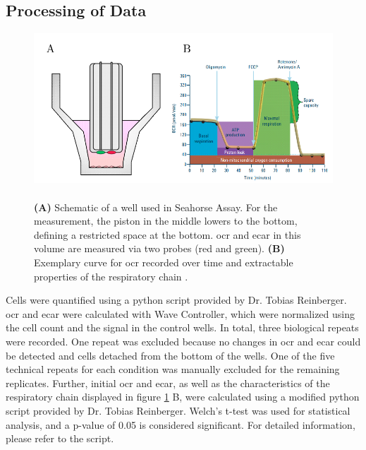     \subsection{Processing of Data}
    \begin{figure}[h]
    \capstart
        \centering
        \includegraphics{Abbildung/seahorse_basics_placeholder.pdf}

        \begin{minipage}{\captionwidth}
            \caption[enrichment]{\\
            \textbf{(A)} Schematic of a well used in Seahorse Assay. For the measurement, the piston in the middle lowers to the bottom, defining a restricted space at the bottom. \ac{ocr} and \ac{ecar} in this volume are measured via two probes (red and green). \textbf{(B)} Exemplary curve for \ac{ocr} recorded over time and extractable properties of the respiratory chain \cite{AGILENT WEBSITE; ADD SOURCE}.}
            \label{fig:seahorse_basics}
        \end{minipage}
    \end{figure}

    Cells were quantified using a python script provided by Dr. Tobias Reinberger. \ac{ocr} and \ac{ecar} were calculated with Wave Controller, which were normalized using the cell count and the signal in the control wells. In total, three biological repeats were recorded. One repeat was excluded because no changes in \ac{ocr} and \ac{ecar} could be detected and cells detached from the bottom of the wells. One of the five technical repeats for each condition was manually excluded for the remaining replicates. Further, initial \ac{ocr} and \ac{ecar}, as well as the characteristics of the respiratory chain displayed in figure \ref{fig:seahorse_basics} B, were calculated using a modified python script provided by Dr. Tobias Reinberger. Welch’s t-test was used for statistical analysis, and a p-value of 0.05 is considered significant. For detailed information, please refer to the script.

